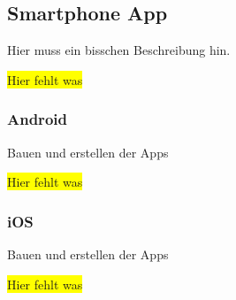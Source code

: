 \subsection{Smartphone App}
Hier muss ein bisschen Beschreibung hin.

\colorbox{yellow}{Hier fehlt was}

\subsubsection{Android}
Bauen und erstellen der Apps

\colorbox{yellow}{Hier fehlt was}

\subsubsection{iOS}
Bauen und erstellen der Apps

\colorbox{yellow}{Hier fehlt was}